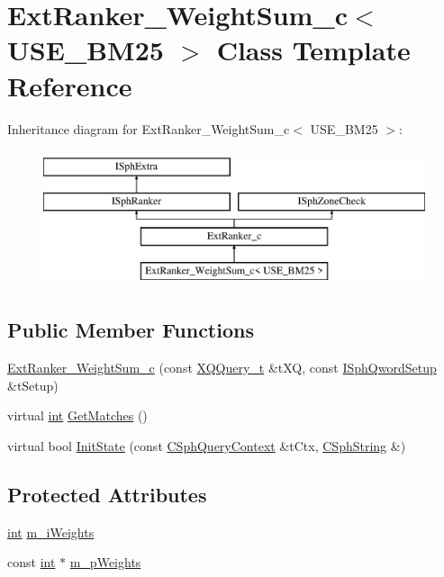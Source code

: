 \hypertarget{classExtRanker__WeightSum__c}{\section{Ext\-Ranker\-\_\-\-Weight\-Sum\-\_\-c$<$ U\-S\-E\-\_\-\-B\-M25 $>$ Class Template Reference}
\label{classExtRanker__WeightSum__c}
}
Inheritance diagram for Ext\-Ranker\-\_\-\-Weight\-Sum\-\_\-c$<$ U\-S\-E\-\_\-\-B\-M25 $>$\-:\begin{figure}[H]
\begin{center}
\leavevmode
\includegraphics[height=4.000000cm]{classExtRanker__WeightSum__c}
\end{center}
\end{figure}
\subsection*{Public Member Functions}
\begin{DoxyCompactItemize}
\item 
\hyperlink{classExtRanker__WeightSum__c_a351174873eb3104a2746dd89edb65648}{Ext\-Ranker\-\_\-\-Weight\-Sum\-\_\-c} (const \hyperlink{structXQQuery__t}{X\-Q\-Query\-\_\-t} \&t\-X\-Q, const \hyperlink{classISphQwordSetup}{I\-Sph\-Qword\-Setup} \&t\-Setup)
\item 
virtual \hyperlink{sphinxexpr_8cpp_a4a26e8f9cb8b736e0c4cbf4d16de985e}{int} \hyperlink{classExtRanker__WeightSum__c_a016946e47d7a439f3491aa155f21a65f}{Get\-Matches} ()
\item 
virtual bool \hyperlink{classExtRanker__WeightSum__c_ab33869f0ac17448050a5d942c0a25db6}{Init\-State} (const \hyperlink{classCSphQueryContext}{C\-Sph\-Query\-Context} \&t\-Ctx, \hyperlink{structCSphString}{C\-Sph\-String} \&)
\end{DoxyCompactItemize}
\subsection*{Protected Attributes}
\begin{DoxyCompactItemize}
\item 
\hyperlink{sphinxexpr_8cpp_a4a26e8f9cb8b736e0c4cbf4d16de985e}{int} \hyperlink{classExtRanker__WeightSum__c_ae076f6845e3d8966a9e3c38975bf7d17}{m\-\_\-i\-Weights}
\item 
const \hyperlink{sphinxexpr_8cpp_a4a26e8f9cb8b736e0c4cbf4d16de985e}{int} $\ast$ \hyperlink{classExtRanker__WeightSum__c_a929c9c18cff29866e4c110c9a2786b71}{m\-\_\-p\-Weights}
\end{DoxyCompactItemize}
